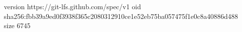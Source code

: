 version https://git-lfs.github.com/spec/v1
oid sha256:fbb39a9ed0f3938f365c2080312910ce1e52eb75ba057475f1e0c8a40886d488
size 6745
